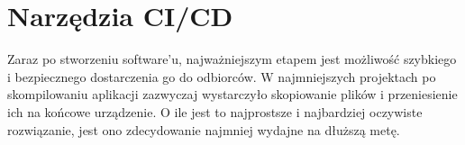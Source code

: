 \section{Narzędzia CI/CD}


Zaraz po stworzeniu software'u, najważniejszym etapem jest możliwość szybkiego i bezpiecznego dostarczenia go do odbiorców.
W najmniejszych projektach po skompilowaniu aplikacji zazwyczaj wystarczyło skopiowanie plików
i przeniesienie ich na końcowe urządzenie. O ile jest to najprostsze i najbardziej oczywiste rozwiązanie,
jest ono zdecydowanie najmniej wydajne na dłuższą metę.





\newpage

